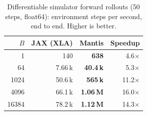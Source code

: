 \begin{table}[t]
  \centering
  \caption{Differentiable simulator forward rollouts (50 steps, float64): environment steps per second, end to end. Higher is better.}
  \label{tab:diffsim}
  \footnotesize
  \setlength{\tabcolsep}{4pt}
  \begin{tabular}{rrrr}
    \toprule
    $B$ & JAX (XLA) & Mantis & Speedup \\
    \midrule
    1 & 140 & \textbf{638} & 4.6$\times$ \\
    64 & 7.66\,k & \textbf{40.4\,k} & 5.3$\times$ \\
    1024 & 50.6\,k & \textbf{565\,k} & 11.2$\times$ \\
    4096 & 66.1\,k & \textbf{1.06\,M} & 16.0$\times$ \\
    16384 & 78.2\,k & \textbf{1.12\,M} & 14.3$\times$ \\
    \bottomrule
  \end{tabular}
\end{table}
